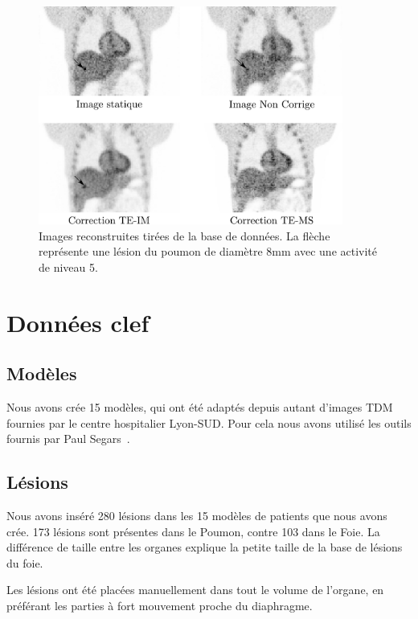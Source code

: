 \begin{figure}
 \centering
 \includegraphics[width=10cm]{images/exempleImageRecon}
 \caption[Images reconstruites tirées de la base de donnée]{Images reconstruites tirées de la base de données. La flèche représente une lésion du poumon de diamètre 8mm avec une activité de niveau 5.}
 \label{fig:exempleImageRecon}
\end{figure}



	\section{Données clef} %

\subsection{Modèles}

Nous avons crée 15 modèles, qui ont été adaptés depuis autant d'images TDM fournies par le centre hospitalier Lyon-SUD. Pour cela nous avons utilisé les outils fournis par Paul Segars~\cite{segars2001These}.


\subsection{Lésions}

Nous avons inséré 280 lésions dans les 15 modèles de patients que nous avons crée. 173 lésions sont présentes dans le Poumon, contre 103 dans le Foie. La différence de taille entre les organes explique la petite taille de la base de lésions du foie. 

Les lésions ont été placées manuellement dans tout le volume de l'organe, en préférant les parties à fort mouvement proche du diaphragme. 

